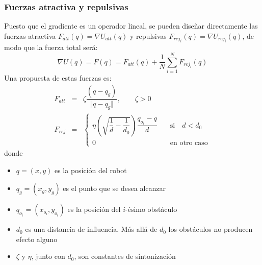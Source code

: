 \begin{frame}\frametitle{Fuerzas atractiva y repulsivas}
  Puesto que el gradiente es un operador lineal, se pueden diseñar directamente las fuerzas atractiva $F_{att}(q) = \nabla U_{att}(q)$ y repulsivas $F_{rej_i}(q) = \nabla U_{rej_i}(q)$, de modo que la fuerza total será:
  \[ \nabla U(q) = F(q) = F_{att}(q) + \frac{1}{N}\sum_{i=1}^N F_{rej_i}(q)\]
  Una propuesta de estas fuerzas es:
  \begin{eqnarray*}
    \label{eq:attractive}
    F_{att} &=& \zeta \dfrac{\left(q - q_g\right) }{\Vert q - q_g \Vert},\qquad \zeta > 0\label{eq:PotFieldsAttraction}\\
    F_{rej} &=& \begin{cases}
                  \eta\left(\sqrt{\dfrac{1}{d} - \dfrac{1}{d_0}}\right)\dfrac{q_{o_i} - q}{d}
                  & \quad\textrm{si}\quad d < d_0\\
                  0 & \quad\textrm{en otro caso}
                \end{cases}
  \end{eqnarray*}
  donde
  \begin{itemize}
  \item $q=(x,y)$ es la posición del robot
  \item $q_g=(x_g, y_g)$ es el punto que se desea alcanzar
  \item $q_{o_i} = (x_{o_i}, y_{o_i})$ es la posición del $i$-ésimo obstáculo
  \item $d_0$ es una distancia de influencia. Más allá de $d_0$ los obstáculos no producen efecto alguno
  \item $\zeta$ y $\eta$, junto con $d_0$, son constantes de sintonización
  \end{itemize}
\end{frame}

